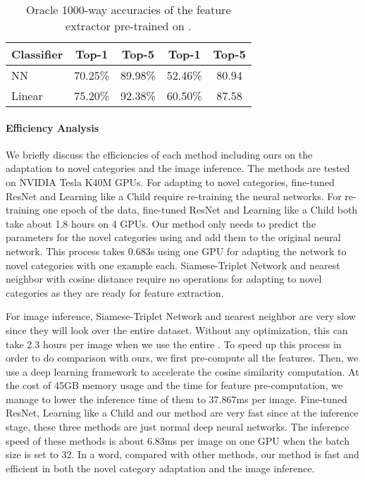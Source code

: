 \begin{table}
    \small
    \centering
    \vspace{0.05in}
    \setlength{\tabcolsep}{0.5em}
    \begin{tabular}{lcccc}
        \toprule
        Classifier & Top-1  & Top-5  & Top-1  & Top-5 \\
        \midrule
        NN & 70.25\% & 89.98\% & 52.46\% & 80.94 \\
        Linear & 75.20\% & 92.38\% & 60.50\% & 87.58 \\
        \bottomrule
    \end{tabular}
    \caption{Oracle 1000-way accuracies of the feature extractor  pre-trained on .}
    \label{tab:oracle}
\end{table}

\paragraph{Efficiency Analysis}
We briefly discuss the efficiencies of each method including ours on the adaptation to novel categories and the image inference.
The methods are tested on NVIDIA Tesla K40M GPUs.
For adapting to novel categories, fine-tuned ResNet and Learning like a Child require re-training the neural networks.
For re-training one epoch of the data, fine-tuned ResNet and Learning like a Child both take about 1.8 hours on 4 GPUs.
Our method only needs to predict the parameters for the novel categories using  and add them to the original neural network.
This process takes 0.683s using one GPU for adapting the network to  novel categories with one example each.
Siamese-Triplet Network and nearest neighbor with cosine distance require no operations for adapting to novel categories as they are ready for feature extraction.

For image inference, Siamese-Triplet Network and nearest neighbor are very slow since they will look over the entire dataset. Without any optimization, this can take 2.3 hours per image when we use the entire .
To speed up this process in order to do comparison with ours, we first pre-compute all the features.
Then, we use a deep learning framework to accelerate the cosine similarity computation.
At the cost of 45GB memory usage and the time for feature pre-computation, we manage to lower the inference time of them to 37.867ms per image.
Fine-tuned ResNet, Learning like a Child and our method are very fast since at the inference stage, these three methods are just normal deep neural networks.
The inference speed of these methods is about 6.83ms per image on one GPU when the batch size is set to 32.
In a word, compared with other methods, our method is fast and efficient in both the novel category adaptation and the image inference.

